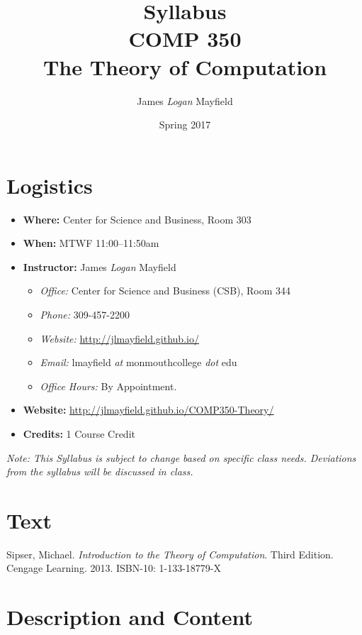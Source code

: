 \documentclass[10pt]{article}
\title{Syllabus \\ COMP 350 \\ The Theory of Computation}
\author{ James \textit{Logan} Mayfield }
\date{ Spring 2017 }
\begin{document}
\maketitle

\section{Logistics}
\begin{itemize}
\item \textbf{Where: } Center for Science and Business, Room 303
\item \textbf{When: } MTWF 11:00--11:50am
\item \textbf{Instructor: } James \textit{Logan} Mayfield\begin{itemize}
\item \textit{Office: } Center for Science and Business (CSB), Room 344
\item \textit{Phone: } 309-457-2200 %
\item \textit{Website: } \url{http://jlmayfield.github.io/}
\item \textit{Email: } lmayfield \textit{at} monmouthcollege \textit{dot} edu
\item \textit{Office Hours: }  By Appointment.
\end{itemize}
\item \textbf{Website: } \url{http://jlmayfield.github.io/COMP350-Theory/}
\item \textbf{Credits: } 1 Course Credit
\end{itemize}
\emph{Note: This Syllabus is subject to change based on specific class needs. Deviations from the syllabus will be discussed in class.}


\section{Text}

Sipser, Michael. \textit{Introduction to the Theory of Computation}. Third Edition. Cengage Learning. 2013. ISBN-10: 1-133-18779-X %


\section{Description and Content}
\end{document}
